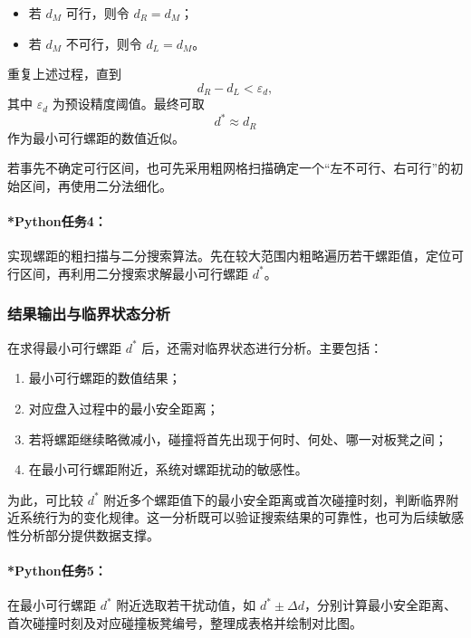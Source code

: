 \documentclass[12pt,a4paper]{ctexart}
\begin{document}
\begin{itemize}
    \item 若 $d_M$ 可行，则令 $d_R=d_M$；
    \item 若 $d_M$ 不可行，则令 $d_L=d_M$。
\end{itemize}

重复上述过程，直到
\begin{equation}
d_R-d_L<\varepsilon_d,
\end{equation}
其中 $\varepsilon_d$ 为预设精度阈值。最终可取
\begin{equation}
d^\ast\approx d_R
\end{equation}
作为最小可行螺距的数值近似。

若事先不确定可行区间，也可先采用粗网格扫描确定一个“左不可行、右可行”的初始区间，再使用二分法细化。

\paragraph{*Python任务4：}
实现螺距的粗扫描与二分搜索算法。先在较大范围内粗略遍历若干螺距值，定位可行区间，再利用二分搜索求解最小可行螺距 $d^\ast$。

\subsubsection{结果输出与临界状态分析}
在求得最小可行螺距 $d^\ast$ 后，还需对临界状态进行分析。主要包括：

\begin{enumerate}
    \item 最小可行螺距的数值结果；
    \item 对应盘入过程中的最小安全距离；
    \item 若将螺距继续略微减小，碰撞将首先出现于何时、何处、哪一对板凳之间；
    \item 在最小可行螺距附近，系统对螺距扰动的敏感性。
\end{enumerate}

为此，可比较 $d^\ast$ 附近多个螺距值下的最小安全距离或首次碰撞时刻，判断临界附近系统行为的变化规律。这一分析既可以验证搜索结果的可靠性，也可为后续敏感性分析部分提供数据支撑。

\paragraph{*Python任务5：}
在最小可行螺距 $d^\ast$ 附近选取若干扰动值，如 $d^\ast\pm \Delta d$，分别计算最小安全距离、首次碰撞时刻及对应碰撞板凳编号，整理成表格并绘制对比图。
\end{document}
